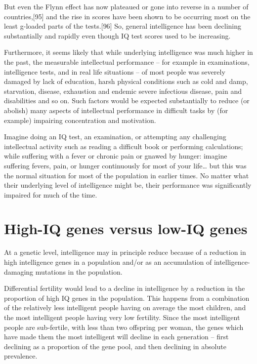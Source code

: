 \documentclass[
]{book}
\begin{document}
But even the Flynn effect has now plateaued or gone into reverse in a number of countries,{[}95{]} and the rise in scores have been shown to be occurring most on the least g-loaded parts of the tests.{[}96{]} So, general intelligence has been declining substantially and rapidly even though IQ test scores used to be increasing.

Furthermore, it seems likely that while underlying intelligence was much higher in the past, the measurable intellectual performance -- for example in examinations, intelligence tests, and in real life situations -- of most people was severely damaged by lack of education, harsh physical conditions such as cold and damp, starvation, disease, exhaustion and endemic severe infectious disease, pain and disabilities and so on. Such factors would be expected substantially to reduce (or abolish) many aspects of intellectual performance in difficult tasks by (for example) impairing concentration and motivation.

Imagine doing an IQ test, an examination, or attempting any challenging intellectual activity such as reading a difficult book or performing calculations; while suffering with a fever or chronic pain or gnawed by hunger: imagine suffering fevers, pain, or hunger continuously for most of your life\ldots{} but this was the normal situation for most of the population in earlier times. No matter what their underlying level of intelligence might be, their performance was significantly impaired for much of the time.

\hypertarget{high-iq-genes-versus-low-iq-genes}{%
\section{High-IQ genes versus low-IQ genes}\label{high-iq-genes-versus-low-iq-genes}}

At a genetic level, intelligence may in principle reduce because of a reduction in high intelligence genes in a population and/or as an accumulation of intelligence-damaging mutations in the population.

Differential fertility would lead to a decline in intelligence by a reduction in the proportion of high IQ genes in the population. This happens from a combination of the relatively less intelligent people having on average the most children, and the most intelligent people having very low fertility. Since the most intelligent people are sub-fertile, with less than two offspring per woman, the genes which have made them the most intelligent will decline in each generation -- first declining as a proportion of the gene pool, and then declining in absolute prevalence.
\end{document}
